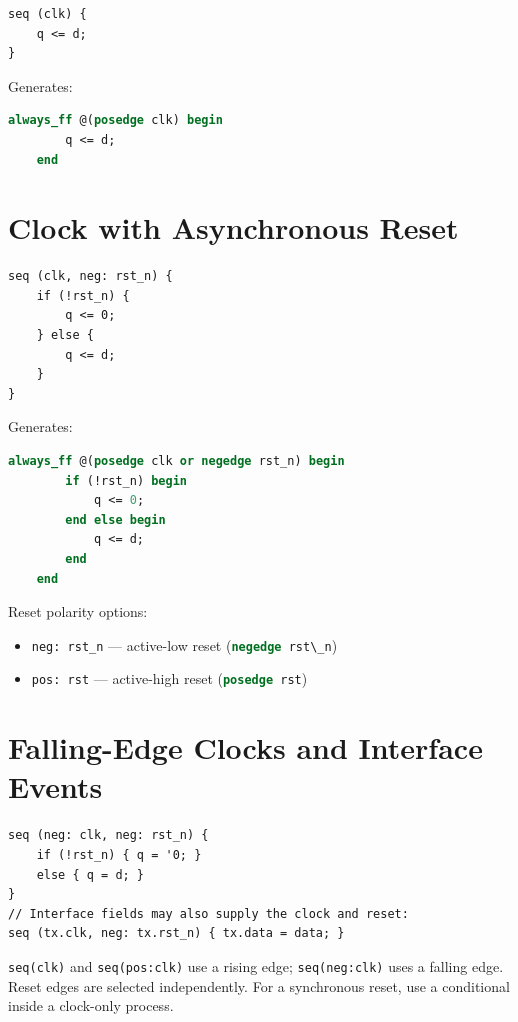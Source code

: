 \documentclass[lang=en,11pt]{elegantbook}
\newcommand{\code}[1]{\texttt{#1}}
\newcommand{\svinline}[1]{\lstinline[language=SystemVerilog]|#1|}
\begin{document}
\begin{lstlisting}[language=Slip]
seq (clk) {
    q <= d;
}
\end{lstlisting}

Generates:

\begin{lstlisting}[language=SystemVerilog]
    always_ff @(posedge clk) begin
        q <= d;
    end
\end{lstlisting}

\section{Clock with Asynchronous Reset}

\begin{lstlisting}[language=Slip]
seq (clk, neg: rst_n) {
    if (!rst_n) {
        q <= 0;
    } else {
        q <= d;
    }
}
\end{lstlisting}

Generates:

\begin{lstlisting}[language=SystemVerilog]
    always_ff @(posedge clk or negedge rst_n) begin
        if (!rst_n) begin
            q <= 0;
        end else begin
            q <= d;
        end
    end
\end{lstlisting}

Reset polarity options:
\begin{itemize}
  \item \code{neg: rst\_n} --- active-low reset (\svinline{negedge rst\_n})
  \item \code{pos: rst} --- active-high reset (\svinline{posedge rst})
\end{itemize}

\section{Falling-Edge Clocks and Interface Events}

\begin{lstlisting}[language=Slip]
seq (neg: clk, neg: rst_n) {
    if (!rst_n) { q = '0; }
    else { q = d; }
}
// Interface fields may also supply the clock and reset:
seq (tx.clk, neg: tx.rst_n) { tx.data = data; }
\end{lstlisting}

\code{seq(clk)} and \code{seq(pos:clk)} use a rising edge;
\code{seq(neg:clk)} uses a falling edge. Reset edges are selected independently.
For a synchronous reset, use a conditional inside a clock-only process.
\end{document}

